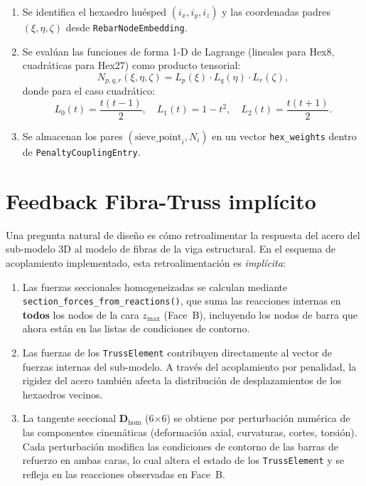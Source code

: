 \begin{enumerate}
  \item Se identifica el hexaedro huésped $(i_x, i_y, i_z)$ y las
        coordenadas padres $(\xi, \eta, \zeta)$ desde
        \texttt{RebarNodeEmbedding}.

  \item Se evalúan las funciones de forma 1-D de Lagrange (lineales
        para Hex8, cuadráticas para Hex27) como producto tensorial:
        \[
          N_{p,q,r}(\xi,\eta,\zeta) =
            L_p(\xi) \cdot L_q(\eta) \cdot L_r(\zeta),
        \]
        donde para el caso cuadrático:
        \[
          L_0(t) = \frac{t(t-1)}{2},\quad
          L_1(t) = 1 - t^2,\quad
          L_2(t) = \frac{t(t+1)}{2}.
        \]

  \item Se almacenan los pares $(\text{sieve\_point}_i, N_i)$ en
        un vector \texttt{hex\_weights} dentro de
        \texttt{PenaltyCouplingEntry}.
\end{enumerate}


\section{Feedback Fibra-Truss implícito}
\label{sec:emb-feedback}

Una pregunta natural de diseño es cómo retroalimentar la respuesta
del acero del sub-modelo 3D al modelo de fibras de la viga
estructural.  En el esquema de acoplamiento implementado, esta
retroalimentación es \emph{implícita}:

\begin{enumerate}
  \item Las fuerzas seccionales homogeneizadas se calculan mediante
        \texttt{section\_forces\_from\_reactions()}, que suma las
        reacciones internas en \textbf{todos} los nodos de la cara
        $z_{\max}$ (Face~B), incluyendo los nodos de barra que ahora
        están en las listas de condiciones de contorno.

  \item Las fuerzas de los \texttt{TrussElement} contribuyen
        directamente al vector de fuerzas internas del sub-modelo.
        A través del acoplamiento por penalidad, la rigidez del acero
        también afecta la distribución de desplazamientos de los
        hexaedros vecinos.

  \item La tangente seccional $\mathbf{D}_{\text{hom}}$ (6$\times$6)
        se obtiene por perturbación numérica de las componentes
        cinemáticas (deformación axial, curvaturas, cortes,
        torsión).  Cada perturbación modifica las condiciones de
        contorno de las barras de refuerzo en ambas caras, lo cual
        altera el estado de los \texttt{TrussElement} y se refleja
        en las reacciones observadas en Face~B.
\end{enumerate}

